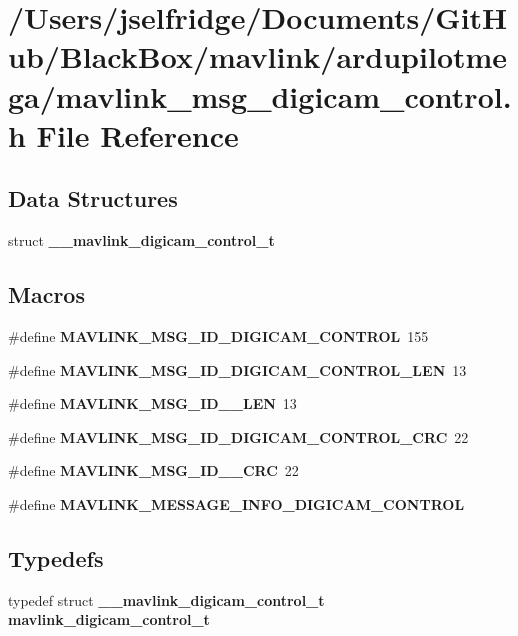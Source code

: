 \section{/\+Users/jselfridge/\+Documents/\+Git\+Hub/\+Black\+Box/mavlink/ardupilotmega/mavlink\+\_\+msg\+\_\+digicam\+\_\+control.h File Reference}
\label{mavlink__msg__digicam__control_8h}
\subsection*{Data Structures}
\begin{DoxyCompactItemize}
\item 
struct \textbf{ \+\_\+\+\_\+mavlink\+\_\+digicam\+\_\+control\+\_\+t}
\end{DoxyCompactItemize}
\subsection*{Macros}
\begin{DoxyCompactItemize}
\item 
\#define \textbf{ M\+A\+V\+L\+I\+N\+K\+\_\+\+M\+S\+G\+\_\+\+I\+D\+\_\+\+D\+I\+G\+I\+C\+A\+M\+\_\+\+C\+O\+N\+T\+R\+OL}~155
\item 
\#define \textbf{ M\+A\+V\+L\+I\+N\+K\+\_\+\+M\+S\+G\+\_\+\+I\+D\+\_\+\+D\+I\+G\+I\+C\+A\+M\+\_\+\+C\+O\+N\+T\+R\+O\+L\+\_\+\+L\+EN}~13
\item 
\#define \textbf{ M\+A\+V\+L\+I\+N\+K\+\_\+\+M\+S\+G\+\_\+\+I\+D\+\_\+\_\+\+L\+EN}~13
\item 
\#define \textbf{ M\+A\+V\+L\+I\+N\+K\+\_\+\+M\+S\+G\+\_\+\+I\+D\+\_\+\+D\+I\+G\+I\+C\+A\+M\+\_\+\+C\+O\+N\+T\+R\+O\+L\+\_\+\+C\+RC}~22
\item 
\#define \textbf{ M\+A\+V\+L\+I\+N\+K\+\_\+\+M\+S\+G\+\_\+\+I\+D\+\_\+\_\+\+C\+RC}~22
\item 
\#define \textbf{ M\+A\+V\+L\+I\+N\+K\+\_\+\+M\+E\+S\+S\+A\+G\+E\+\_\+\+I\+N\+F\+O\+\_\+\+D\+I\+G\+I\+C\+A\+M\+\_\+\+C\+O\+N\+T\+R\+OL}
\end{DoxyCompactItemize}
\subsection*{Typedefs}
\begin{DoxyCompactItemize}
\item 
typedef struct \textbf{ \+\_\+\+\_\+mavlink\+\_\+digicam\+\_\+control\+\_\+t} \textbf{ mavlink\+\_\+digicam\+\_\+control\+\_\+t}
\end{DoxyCompactItemize}


